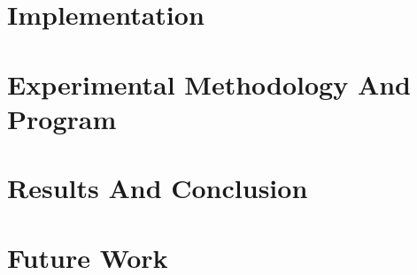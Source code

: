 \documentclass{report}
\begin{document}
\chapter{Implementation}
\label{chapter:implementation}


\chapter{Experimental Methodology And Program}
\label{chapter:experimental_methodology_and_program}


\chapter{Results And Conclusion}
\label{chapter:results_and_conclusion}


\chapter{Future Work}
\label{chapter:future_work}


\newpage


 
\end{document}
